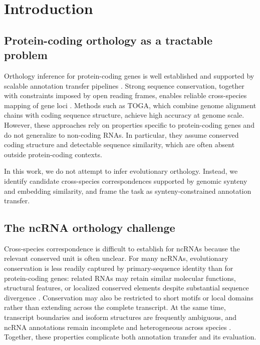 \section{Introduction}
\label{sec:intro}

\subsection{Protein-coding orthology as a tractable problem}
Orthology inference for protein-coding genes is well established and supported by
scalable annotation transfer pipelines
\citep{kirilenkoIntegratingGeneAnnotation2023,sharmaIncreasedAlignmentSensitivity2017,kentEvolutionsCauldronDuplication2003,sharmaCESAR20Substantially2017,herreroEnsemblComparativeGenomics2016,fitchDistinguishingHomologousAnalogous1970,kooninOrthologsParalogsEvolutionary2005}.
Strong sequence conservation, together with constraints imposed by open reading
frames, enables reliable cross-species mapping of gene loci
\citep{sharmaIncreasedAlignmentSensitivity2017,sharmaCESAR20Substantially2017}.
Methods such as TOGA, which combine genome alignment chains with coding sequence
structure, achieve high accuracy at genome scale. However, these approaches rely
on properties specific to protein-coding genes and do not generalize to
non-coding RNAs. In particular, they assume conserved coding structure and
detectable sequence similarity, which are often absent outside protein-coding
contexts.

In this work, we do not attempt to infer evolutionary orthology. Instead, we
identify candidate cross-species correspondences supported by genomic synteny
and embedding similarity, and frame the task as synteny-constrained annotation
transfer.

\subsection{The ncRNA orthology challenge}
Cross-species correspondence is difficult to establish for ncRNAs because the
relevant conserved unit is often unclear. For many ncRNAs, evolutionary
conservation is less readily captured by primary-sequence identity than for
protein-coding genes: related RNAs may retain similar molecular functions,
structural features, or localized conserved elements despite substantial
sequence divergence
\citep{ulitskyLincRNAsGenomicsEvolution2013,
  diederichsFourDimensionsNoncoding2014,
  hezroniPrinciplesLongNoncoding2015,
  rivasEvolutionaryConservationRNA2021,
  ulitskyEvolutionRescueUsing2016,
  statelloGeneRegulationLong2021}.
Conservation may also be restricted to short motifs or local domains rather than
extending across the complete transcript. At the same time, transcript
boundaries and isoform structures are frequently ambiguous, and ncRNA
annotations remain incomplete and heterogeneous across species
\citep{mattickLongNoncodingRNAs2023,perteaCHESSNewHuman2018}.
Together, these properties complicate both annotation transfer and its
evaluation.

